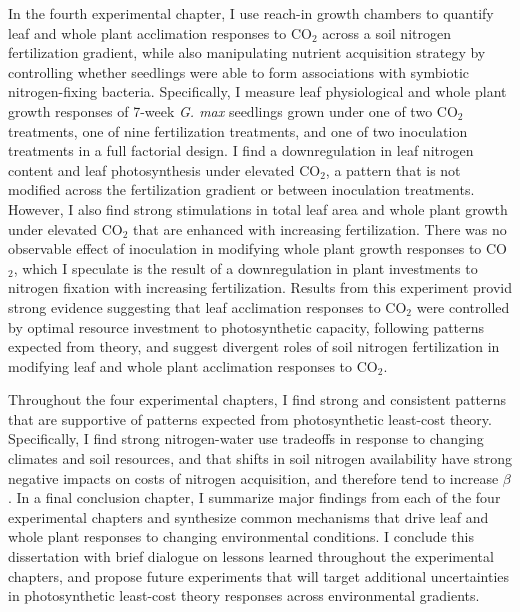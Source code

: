 In the fourth experimental chapter, I use reach-in growth chambers to quantify leaf and whole plant acclimation responses to CO$_2$ across a soil nitrogen fertilization gradient, while also manipulating nutrient acquisition strategy by controlling whether seedlings were able to form associations with symbiotic nitrogen-fixing bacteria. Specifically, I measure leaf physiological and whole plant growth responses of 7-week \textit{G. max} seedlings grown under one of two CO$_2$ treatments, one of nine fertilization treatments, and one of two inoculation treatments in a full factorial design. I find a downregulation in leaf nitrogen content and leaf photosynthesis under elevated CO$_2$, a pattern that is not modified across the fertilization gradient or between inoculation treatments. However, I also find strong stimulations in total leaf area and whole plant growth under elevated CO$_2$ that are enhanced with increasing fertilization. There was no observable effect of inoculation in modifying whole plant growth responses to CO$_2$, which I speculate is the result of a downregulation in plant investments to nitrogen fixation with increasing fertilization. Results from this experiment provid strong evidence suggesting that leaf acclimation responses to CO$_2$ were controlled by optimal resource investment to photosynthetic capacity, following patterns expected from theory, and suggest divergent roles of soil nitrogen fertilization in modifying leaf and whole plant acclimation responses to CO$_2$.

Throughout the four experimental chapters, I find strong and consistent patterns that are supportive of patterns expected from photosynthetic least-cost theory. Specifically, I find strong nitrogen-water use tradeoffs in response to changing climates and soil resources, and that shifts in soil nitrogen availability have strong negative impacts on costs of nitrogen acquisition, and therefore tend to increase $\beta$. In a final conclusion chapter, I summarize major findings from each of the four experimental chapters and synthesize common mechanisms that drive leaf and whole plant responses to changing environmental conditions. I conclude this dissertation with brief dialogue on lessons learned throughout the experimental chapters, and propose future experiments that will target additional uncertainties in photosynthetic least-cost theory responses across environmental gradients.